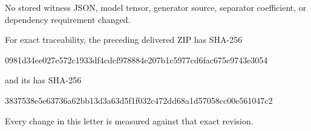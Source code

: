 \documentclass[11pt,a4paper]{article}
\begin{document}
No stored witness JSON, model tensor, generator source, separator
coefficient, or dependency requirement changed.

For exact traceability, the preceding delivered ZIP has SHA-256
\begin{center}\scriptsize\ttfamily
0981d34ee027e572c1933df4cdcf978884e207b1c5977cd6fac675e9743e3054
\end{center}
and its  has SHA-256
\begin{center}\scriptsize\ttfamily
3837538e5e63736a62bb13d3a63d5f1f032c472dd68a1d57058cc00e561047c2
\end{center}
Every change in this letter is measured against that exact revision.
\end{document}
